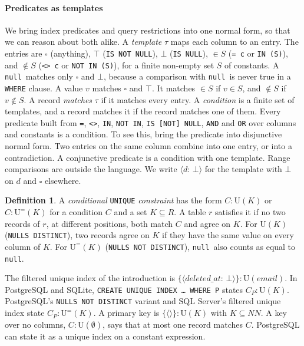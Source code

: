 \documentclass[conference]{IEEEtran}
\theoremstyle{definition}
\newtheorem{definition}[theorem]{Definition}
\newcommand{\sql}[1]{\texttt{#1}}
\newcommand{\nul}{\texttt{null}}
\newcommand{\NN}{\mathit{NN}}
\newcommand{\U}[1]{\mathrm{U}(#1)}
\newcommand{\Ueq}[1]{\mathrm{U}^{=}(#1)}
\newcommand{\any}{\square}
\newcommand{\tpl}[1]{\ensuremath{\langle #1\rangle}}
\begin{document}
\paragraph*{Predicates as templates} We bring index predicates and query restrictions into one normal form, so that
we can reason about both alike. A \emph{template} $\tau$ maps each column to an entry. The entries are $\any$
(anything), $\top$ (\sql{IS NOT NULL}), $\bot$ (\sql{IS NULL}), ${\in}S$ (\sql{= c} or \sql{IN (S)}), and ${\notin}S$
(\sql{<> c} or \sql{NOT IN (S)}), for a finite non-empty set $S$ of constants. A \nul\ matches only $\any$ and $\bot$,
because a comparison with \nul\ is never true in a \sql{WHERE} clause. A value $v$ matches $\any$ and $\top$. It matches
${\in}S$ if $v\in S$, and ${\notin}S$ if $v\notin S$. A record \emph{matches} $\tau$ if it matches every entry. A
\emph{condition} is a finite set of templates, and a record matches it if the record matches one of them. Every
predicate built from \sql{=}, \sql{<>}, \sql{IN}, \sql{NOT IN}, \sql{IS [NOT] NULL}, \sql{AND} and \sql{OR} over columns
and constants is a condition. To see this, bring the predicate into disjunctive normal form. Two entries on the same
column combine into one entry, or into a contradiction. A conjunctive predicate is a condition with one template. Range
comparisons are outside the language. We write $\tpl{d{:}\,\bot}$ for the template with $\bot$ on $d$ and $\any$
elsewhere.

\begin{definition}
A \emph{conditional} \sql{UNIQUE} \emph{constraint} has the form $C:\U{K}$ or $C:\Ueq{K}$ for a
condition $C$ and a set $K\subseteq R$. A table $r$ satisfies it if no two records of $r$, at different positions,
both match $C$ and agree on $K$. For $\U{K}$ (\sql{NULLS DISTINCT}), two records agree on $K$ if they have the same value
on every column of $K$. For $\Ueq{K}$ (\sql{NULLS NOT DISTINCT}), \nul\ also counts as equal to \nul.
\end{definition}

The filtered unique index of the introduction is $\{\tpl{\mathit{deleted\_at}{:}\,\bot}\}:\U{\mathit{email}}$. In
PostgreSQL and SQLite, \sql{CREATE UNIQUE INDEX \ldots\ WHERE P} states $C_P:\U{K}$. PostgreSQL's \sql{NULLS NOT DISTINCT}
variant and SQL Server's filtered unique index state $C_P:\Ueq{K}$. A primary key is $\{\tpl{}\}:\U{K}$ with
$K\subseteq\NN$. A key over no columns, $C:\U{\emptyset}$, says that at most one record matches $C$. PostgreSQL can state
it as a unique index on a constant expression.
\end{document}
